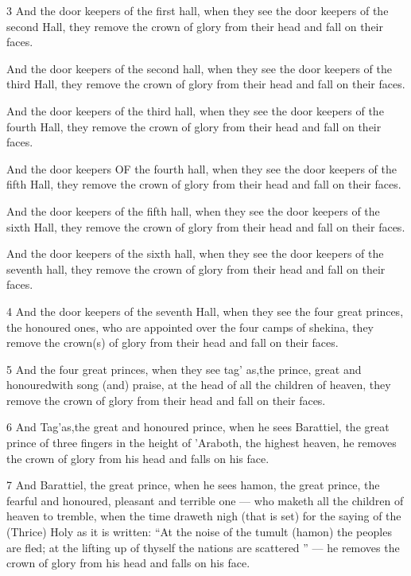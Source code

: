 \par 3 And the door keepers of the first hall, when they see the door keepers of the second Hall, they remove the crown of glory from their head and fall on their faces. 

\par And the door keepers of the second hall, when they see the door keepers of the third Hall, they remove the crown of glory from their head and fall on their faces. 

\par And the door keepers of the third hall, when they see the door keepers of the fourth Hall, they remove the crown of glory from their head and fall on their faces. 

\par And the door keepers OF the fourth hall, when they see the door keepers of the fifth Hall, they remove the crown of glory from their head and fall on their faces. 

\par And the door keepers of the fifth hall, when they see the door keepers of the sixth Hall, they remove the crown of glory from their head and fall on their faces. 

\par And the door keepers of the sixth hall, when they see the door keepers of the seventh hall, they remove the crown of glory from their head and fall on their faces.

\par 4 And the door keepers of the seventh Hall, when they see the four great princes, the honoured ones, who are appointed over the four camps of shekina, they remove the crown(s) of glory from their head and fall on their faces. 

\par 5 And the four great princes, when they see tag' as,the prince, great and honouredwith song (and) praise, at the head of all the children of heaven, they remove the crown of glory from their head and fall on their faces. 

\par 6 And Tag'as,the great and honoured prince, when he sees Barattiel, the great prince of three fingers in the height of 'Araboth, the highest heaven, he removes the crown of glory from his head and falls on his face. 

\par 7 And Barattiel, the great prince, when he sees hamon, the great prince, the fearful and honoured, pleasant and terrible one — who maketh all the children of heaven to tremble, when the time draweth nigh (that is set) for the saying of the (Thrice) Holy as it is written: “At the noise of the tumult (hamon) the peoples are fled; at the lifting up of thyself the nations are scattered ” — he removes the crown of glory from his head and falls on his face. 

